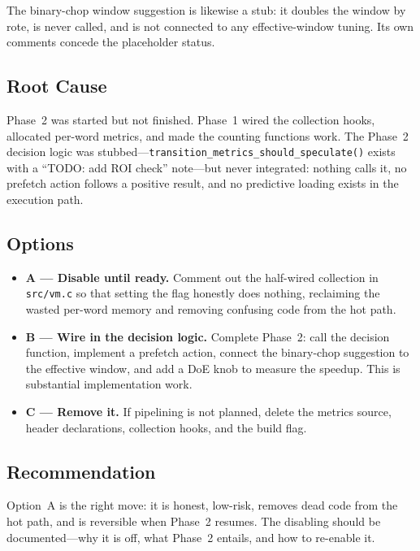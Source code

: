 The binary-chop window suggestion is likewise a stub: it doubles the window by
rote, is never called, and is not connected to any effective-window tuning. Its
own comments concede the placeholder status.

\subsection{Root Cause}

Phase~2 was started but not finished. Phase~1 wired the collection hooks,
allocated per-word metrics, and made the counting functions work. The Phase~2
decision logic was stubbed---\lstinline{transition_metrics_should_speculate()}
exists with a ``TODO: add ROI check'' note---but never integrated: nothing calls
it, no prefetch action follows a positive result, and no predictive loading
exists in the execution path.

\subsection{Options}

\begin{itemize}
  \item \textbf{A --- Disable until ready.} Comment out the half-wired
        collection in \lstinline{src/vm.c} so that setting the flag honestly
        does nothing, reclaiming the wasted per-word memory and removing
        confusing code from the hot path.
  \item \textbf{B --- Wire in the decision logic.} Complete Phase~2: call the
        decision function, implement a prefetch action, connect the binary-chop
        suggestion to the effective window, and add a DoE knob to measure the
        speedup. This is substantial implementation work.
  \item \textbf{C --- Remove it.} If pipelining is not planned, delete the
        metrics source, header declarations, collection hooks, and the build
        flag.
\end{itemize}

\subsection{Recommendation}

Option~A is the right move: it is honest, low-risk, removes dead code from the
hot path, and is reversible when Phase~2 resumes. The disabling should be
documented---why it is off, what Phase~2 entails, and how to re-enable it.

